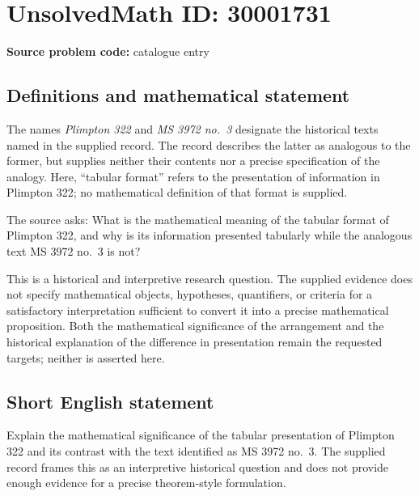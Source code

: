 \documentclass[11pt]{article}
\begin{document}
\section*{UnsolvedMath ID: 30001731}
\textbf{Source problem code:} catalogue entry
\subsection{Definitions and mathematical statement}
The names \emph{Plimpton 322} and \emph{MS 3972 no.\ 3} designate the historical texts named in the supplied record. The record describes the latter as analogous to the former, but supplies neither their contents nor a precise specification of the analogy. Here, ``tabular format'' refers to the presentation of information in Plimpton 322; no mathematical definition of that format is supplied.

The source asks: What is the mathematical meaning of the tabular format of Plimpton 322, and why is its information presented tabularly while the analogous text MS 3972 no.\ 3 is not?

This is a historical and interpretive research question. The supplied evidence does not specify mathematical objects, hypotheses, quantifiers, or criteria for a satisfactory interpretation sufficient to convert it into a precise mathematical proposition. Both the mathematical significance of the arrangement and the historical explanation of the difference in presentation remain the requested targets; neither is asserted here.
\subsection{Short English statement}
Explain the mathematical significance of the tabular presentation of Plimpton 322 and its contrast with the text identified as MS 3972 no.\ 3. The supplied record frames this as an interpretive historical question and does not provide enough evidence for a precise theorem-style formulation.
\end{document}
